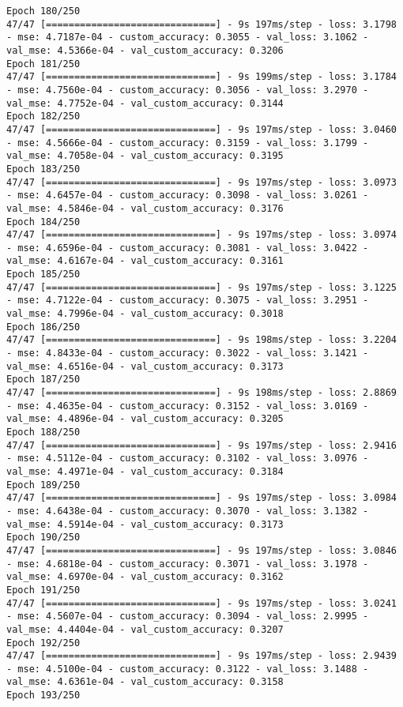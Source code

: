 \begin{lstlisting}
Epoch 180/250
47/47 [==============================] - 9s 197ms/step - loss: 3.1798 - mse: 4.7187e-04 - custom_accuracy: 0.3055 - val_loss: 3.1062 - val_mse: 4.5366e-04 - val_custom_accuracy: 0.3206
Epoch 181/250
47/47 [==============================] - 9s 199ms/step - loss: 3.1784 - mse: 4.7560e-04 - custom_accuracy: 0.3056 - val_loss: 3.2970 - val_mse: 4.7752e-04 - val_custom_accuracy: 0.3144
Epoch 182/250
47/47 [==============================] - 9s 197ms/step - loss: 3.0460 - mse: 4.5666e-04 - custom_accuracy: 0.3159 - val_loss: 3.1799 - val_mse: 4.7058e-04 - val_custom_accuracy: 0.3195
Epoch 183/250
47/47 [==============================] - 9s 197ms/step - loss: 3.0973 - mse: 4.6457e-04 - custom_accuracy: 0.3098 - val_loss: 3.0261 - val_mse: 4.5846e-04 - val_custom_accuracy: 0.3176
Epoch 184/250
47/47 [==============================] - 9s 197ms/step - loss: 3.0974 - mse: 4.6596e-04 - custom_accuracy: 0.3081 - val_loss: 3.0422 - val_mse: 4.6167e-04 - val_custom_accuracy: 0.3161
Epoch 185/250
47/47 [==============================] - 9s 197ms/step - loss: 3.1225 - mse: 4.7122e-04 - custom_accuracy: 0.3075 - val_loss: 3.2951 - val_mse: 4.7996e-04 - val_custom_accuracy: 0.3018
Epoch 186/250
47/47 [==============================] - 9s 198ms/step - loss: 3.2204 - mse: 4.8433e-04 - custom_accuracy: 0.3022 - val_loss: 3.1421 - val_mse: 4.6516e-04 - val_custom_accuracy: 0.3173
Epoch 187/250
47/47 [==============================] - 9s 198ms/step - loss: 2.8869 - mse: 4.4635e-04 - custom_accuracy: 0.3152 - val_loss: 3.0169 - val_mse: 4.4896e-04 - val_custom_accuracy: 0.3205
Epoch 188/250
47/47 [==============================] - 9s 197ms/step - loss: 2.9416 - mse: 4.5112e-04 - custom_accuracy: 0.3102 - val_loss: 3.0976 - val_mse: 4.4971e-04 - val_custom_accuracy: 0.3184
Epoch 189/250
47/47 [==============================] - 9s 197ms/step - loss: 3.0984 - mse: 4.6438e-04 - custom_accuracy: 0.3070 - val_loss: 3.1382 - val_mse: 4.5914e-04 - val_custom_accuracy: 0.3173
Epoch 190/250
47/47 [==============================] - 9s 197ms/step - loss: 3.0846 - mse: 4.6818e-04 - custom_accuracy: 0.3071 - val_loss: 3.1978 - val_mse: 4.6970e-04 - val_custom_accuracy: 0.3162
Epoch 191/250
47/47 [==============================] - 9s 197ms/step - loss: 3.0241 - mse: 4.5607e-04 - custom_accuracy: 0.3094 - val_loss: 2.9995 - val_mse: 4.4404e-04 - val_custom_accuracy: 0.3207
Epoch 192/250
47/47 [==============================] - 9s 197ms/step - loss: 2.9439 - mse: 4.5100e-04 - custom_accuracy: 0.3122 - val_loss: 3.1488 - val_mse: 4.6361e-04 - val_custom_accuracy: 0.3158
Epoch 193/250

\end{lstlisting}
